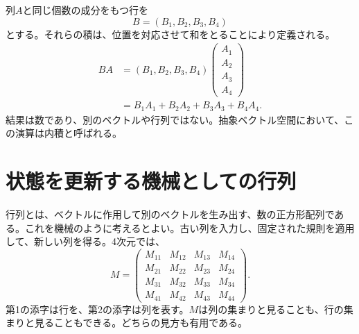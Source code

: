 \begin{classroomqa}
\end{classroomqa}

列\(A\)と同じ個数の成分をもつ行を
\begin{equation}
  B=(B_1,B_2,B_3,B_4)
\end{equation}
とする。それらの積は、位置を対応させて和をとることにより定義される。
\begin{align}
  BA
  &=
  (B_1,B_2,B_3,B_4)
  \begin{pmatrix}
    A_1\\ A_2\\ A_3\\ A_4
  \end{pmatrix}\\
  &=B_1A_1+B_2A_2+B_3A_3+B_4A_4.
  \label{eq:l01-inner-product}
\end{align}
結果は数であり、別のベクトルや行列ではない。抽象ベクトル空間において、この演算は内積と呼ばれる。

\begin{classroomqa}
\end{classroomqa}

\section{状態を更新する機械としての行列}

行列とは、ベクトルに作用して別のベクトルを生み出す、数の正方形配列である。これを機械のように考えるとよい。古い列を入力し、固定された規則を適用して、新しい列を得る。4次元では、
\begin{equation}
  M=
  \begin{pmatrix}
    M_{11}&M_{12}&M_{13}&M_{14}\\
    M_{21}&M_{22}&M_{23}&M_{24}\\
    M_{31}&M_{32}&M_{33}&M_{34}\\
    M_{41}&M_{42}&M_{43}&M_{44}
  \end{pmatrix}.
  \label{eq:l01-general-matrix}
\end{equation}
第1の添字は行を、第2の添字は列を表す。\(M\)は列の集まりと見ることも、行の集まりと見ることもできる。どちらの見方も有用である。

